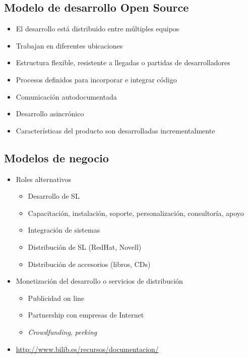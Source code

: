 \subsection {Modelo de desarrollo Open Source}
\begin{itemize}
	\item El desarrollo está distribuido entre múltiples equipos
	\item Trabajan en diferentes ubicaciones
	\item Estructura flexible, resistente a llegadas o partidas de desarrolladores
	\item Procesos definidos para incorporar e integrar código
	\item Comunicación autodocumentada
	\item Desarrollo asincrónico
	\item Características del producto son desarrolladas incrementalmente
\end{itemize}


	
\subsection {Modelos de negocio}
\begin{itemize}
	\item Roles alternativos
	\begin{itemize}
		\item Desarrollo de SL
		\item Capacitación, instalación, soporte, personalización, consultoría, apoyo 
		\item Integración de sistemas
		\item Distribución de SL (RedHat, Novell)
		\item Distribución de accesorios (libros, CDs)	
	\end{itemize}

	\item Monetización del desarrollo o servicios de distribución
	\begin{itemize}
	\item Publicidad on line
	\item Partnership con empresas de Internet
	\item \emph{Crowdfunding}, \emph{perking}
	\end{itemize}

	\item \url{http://www.bilib.es/recursos/documentacion/}
\end{itemize}


